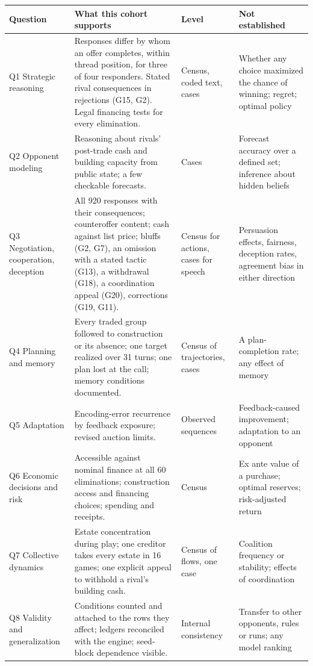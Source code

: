 \begin{table}[htbp]
\centering\footnotesize
\begin{tabularx}{\linewidth}{@{}L{2.5cm}YL{1.6cm}Y@{}}
\toprule
Question & What this cohort supports & Level & Not established\\
\midrule
Q1 Strategic reasoning & Responses differ by whom an offer completes, within thread position, for three of four responders. Stated rival consequences in rejections (G15, G2). Legal financing tests for every elimination. & Census, coded text, cases & Whether any choice maximized the chance of winning; regret; optimal policy\\
Q2 Opponent modeling & Reasoning about rivals' post-trade cash and building capacity from public state; a few checkable forecasts. & Cases & Forecast accuracy over a defined set; inference about hidden beliefs\\
Q3 Negotiation, cooperation, deception & All 920 responses with their consequences; counteroffer content; cash against list price; bluffs (G2, G7), an omission with a stated tactic (G13), a withdrawal (G18), a coordination appeal (G20), corrections (G19, G11). & Census for actions, cases for speech & Persuasion effects, fairness, deception rates, agreement bias in either direction\\
Q4 Planning and memory & Every traded group followed to construction or its absence; one target realized over 31 turns; one plan lost at the call; memory conditions documented. & Census of trajectories, cases & A plan-completion rate; any effect of memory\\
Q5 Adaptation & Encoding-error recurrence by feedback exposure; revised auction limits. & Observed sequences & Feedback-caused improvement; adaptation to an opponent\\
Q6 Economic decisions and risk & Accessible against nominal finance at all 60 eliminations; construction access and financing choices; spending and receipts. & Census & Ex ante value of a purchase; optimal reserves; risk-adjusted return\\
Q7 Collective dynamics & Estate concentration during play; one creditor takes every estate in 16 games; one explicit appeal to withhold a rival's building cash. & Census of flows, one case & Coalition frequency or stability; effects of coordination\\
Q8 Validity and generalization & Conditions counted and attached to the rows they affect; ledgers reconciled with the engine; seed-block dependence visible. & Internal consistency & Transfer to other opponents, rules or runs; any model ranking\\

\end{tabularx}
\end{table}
